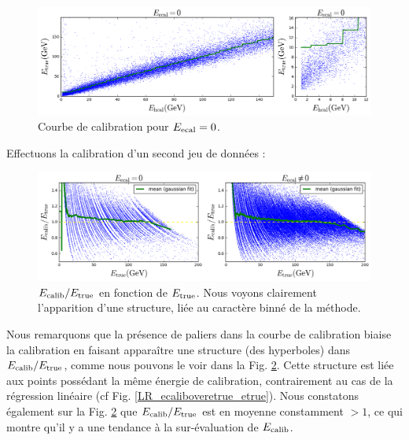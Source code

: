 \documentclass[11pt,a4paper]{article}
\begin{document}
\begin{figure}[!h]
\begin{center}
\includegraphics[width=\textwidth]{images/pictures/testCalibrationLego/CalibrationLego_calibration.png}
\caption{Courbe de calibration pour $E_{\rm ecal} = 0$.}
\label{calibCL}
\end{center}
\end{figure}

Effectuons la calibration d'un second jeu de données :
\begin{figure}[!h]
\begin{center}
\includegraphics[width=\textwidth]{images/pictures/testCalibrationLego/CalibrationLego_ecalib_over_etrue.png}
\caption{$E_{\rm calib}/E_{\rm true}$ en fonction de $E_{\rm true}$. Nous voyons clairement l'apparition d'une structure, liée au caractère binné de la méthode.}
\label{ecaliboveretrueCL}
\end{center}
\end{figure}

Nous remarquons que la présence de paliers dans la courbe de calibration biaise la calibration en faisant apparaître une structure (des hyperboles) dans $E_{\rm calib}/E_{\rm true}$, comme nous pouvons le voir dans la Fig. \ref{ecaliboveretrueCL}. Cette structure est liée aux points possédant la même énergie de calibration, contrairement au cas de la régression linéaire (cf Fig.  \ref{LR_ecaliboveretrue_etrue}). 
Nous constatons également sur la Fig. \ref{ecaliboveretrueCL} que $E_{\rm calib}/E_{\rm true}$ est en moyenne constamment $> 1$, ce qui montre qu'il y a une tendance à la sur-évaluation de $E_{\rm calib}$.
\end{document}
